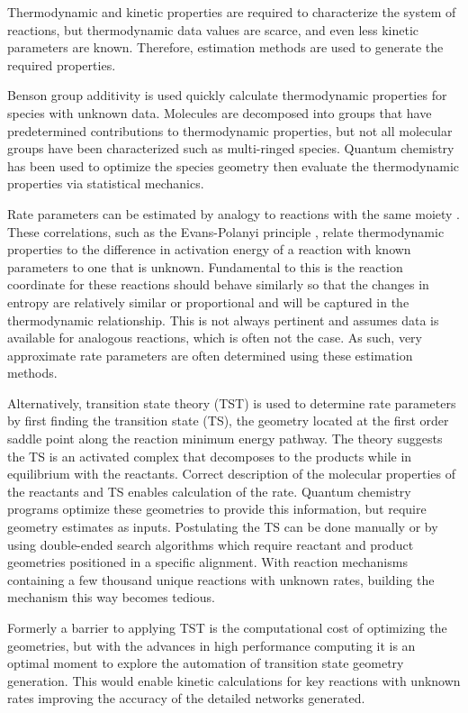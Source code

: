 \documentclass[12pt]{article}
\begin{document}
Thermodynamic and kinetic properties are required to characterize the system of reactions, but thermodynamic data values are scarce, and even less kinetic parameters are known. Therefore, estimation methods are used to generate the required properties.

Benson group additivity \cite{Benson:1976wu} is used quickly calculate thermodynamic properties for species with unknown data. Molecules are decomposed into groups that have predetermined contributions to thermodynamic properties, but not all molecular groups have been characterized such as multi-ringed species. Quantum chemistry has been used to optimize the species geometry then evaluate the thermodynamic properties via statistical mechanics.

Rate parameters can be estimated by analogy to reactions with the same moiety \cite{Sumathi:2002gm}. These correlations, such as the Evans-Polanyi principle \cite{Evans:1938dl}, relate thermodynamic properties to the difference in activation energy of a reaction with known parameters to one that is unknown. Fundamental to this is the reaction coordinate for these reactions should behave similarly so that the changes in entropy are relatively similar or proportional and will be captured in the thermodynamic relationship. This is not always pertinent \cite{Hemelsoet:hk} and assumes data is available for analogous reactions, which is often not the case. As such, very approximate rate parameters are often determined using these estimation methods.

Alternatively, transition state theory (TST) is used to determine rate parameters by first finding the transition state (TS), the geometry located at the first order saddle point along the reaction minimum energy pathway. The theory suggests the TS is an activated complex that decomposes to the products while in equilibrium with the reactants. Correct description of the molecular properties of the reactants and TS enables calculation of the rate. Quantum chemistry programs optimize these geometries to provide this information, but require geometry estimates as inputs. Postulating the TS can be done manually or by using double-ended search algorithms which require reactant and product geometries positioned in a specific alignment. With reaction mechanisms containing a few thousand unique reactions with unknown rates, building the mechanism this way becomes tedious.

Formerly a barrier to applying TST is the computational cost of optimizing the geometries, but with the advances in high performance computing it is an optimal moment to explore the automation of transition state geometry generation. This would enable kinetic calculations for key reactions with unknown rates improving the accuracy of the detailed networks generated.
\end{document}
